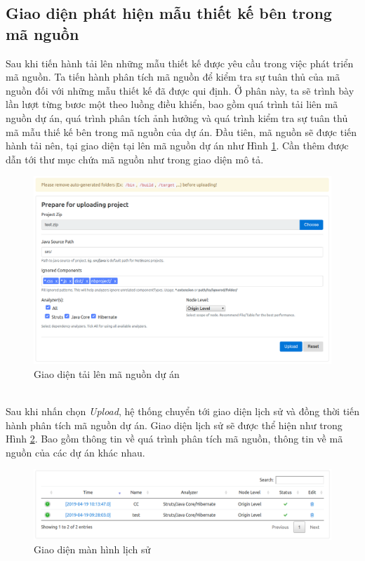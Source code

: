 \documentclass[12pt]{report}
\begin{document}
\subsection{Giao diện phát hiện mẫu thiết kế bên trong mã nguồn}
Sau khi tiến hành tải lên những mẫu thiết kế được yêu cầu trong việc phát triển mã nguồn. Ta tiến hành phân tích mã nguồn để kiểm tra sự tuân thủ của mã nguồn đối với những mẫu thiết kế đã được qui định. Ở phân này, ta sẽ trình bày lần lượt từng bươc một theo luồng điều khiển, bao gồm quá trình tải liên mã nguồn dự án, quá trình phân tích ảnh hưởng và quá trình kiểm tra sự tuân thủ mã mẫu thiế kế bên trong mã nguồn của dự án.
Đầu tiên, mã nguồn sẽ được tiến hành tải nên, tại giao diện tại lên mã nguồn dự án như Hình \ref{fig:upload_project_source_code}. Cần thêm được dẫn tới thư mục chứa mã nguồn như trong giao diện mô tả.
\begin{figure}[h]
	\centering
	\includegraphics[scale=0.35]{images/upload_project}
	\caption{Giao diện tải lên mã nguồn dự án}
	\label{fig:upload_project_source_code}
\end{figure}\\
Sau khi nhấn chọn \textit{Upload}, hệ thống chuyển tới giao diện lịch sử và đồng thời tiến hành phân tích mã nguồn dự án. Giao diện lịch sử sẽ được thể hiện như trong Hình \ref{fig:history_screen}. Bao gồm thông tin về quá trình phân tích mã nguồn, thông tin về mã nguồn của các dự án khác nhau.
\begin{figure}[h]
	\centering
	\includegraphics[scale=0.38]{images/history_screen}
	\caption{Giao diện màn hình lịch sử}
	\label{fig:history_screen}
\end{figure}\\
\end{document}

